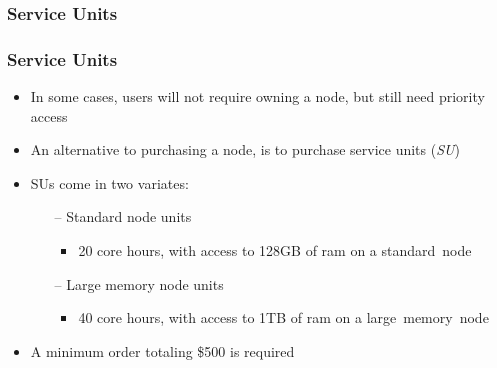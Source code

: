 \documentclass[t,hyperref={pdfpagelabels=false}]{beamer}
\begin{document}
\subsubsection{Service Units}
\begin{frame}	
	\frametitle{Service Units}
	\begin{itemize}
	 \item In some cases, users will not require owning a node, but still need priority access
	 \item An alternative to purchasing a node, is to purchase service units (\emph{SU})
	 \item SUs come in two variates:
		 \begin{itemize}
			 \item[--] Standard node units 
				\begin{itemize}
					\item 20 core hours, with access to 128GB of ram on a standard~node
				\end{itemize}
			 \item[--] Large memory node units
				\begin{itemize}
					\item 40 core hours, with access to 1TB of ram on a large~memory~node
				\end{itemize}
		 \end{itemize}
	 \item A minimum order totaling \$500 is required
	\end{itemize}
\end{frame}
\end{document}
